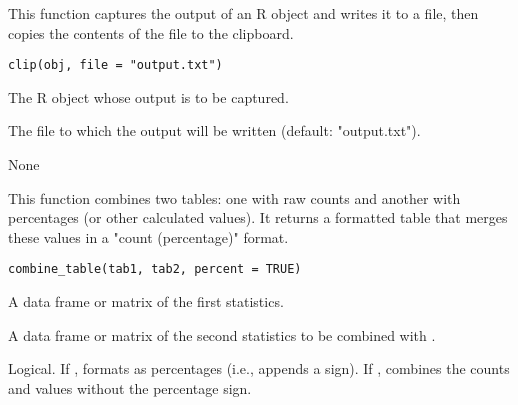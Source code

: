 \documentclass[a4paper]{book}
\begin{document}
%
\begin{Description}
This function captures the output of an R object and writes it to a file, then copies the contents of the file to the clipboard.
\end{Description}
%
\begin{Usage}
\begin{verbatim}
clip(obj, file = "output.txt")
\end{verbatim}
\end{Usage}
%
\begin{Arguments}
\begin{ldescription}
\item[\code{obj}] The R object whose output is to be captured.

\item[\code{file}] The file to which the output will be written (default: "output.txt").
\end{ldescription}
\end{Arguments}
%
\begin{Value}
None
\end{Value}
%
\begin{Description}
This function combines two tables: one with raw counts and another with percentages (or other calculated values). It returns a formatted table that merges these values in a "count (percentage)" format.
\end{Description}
%
\begin{Usage}
\begin{verbatim}
combine_table(tab1, tab2, percent = TRUE)
\end{verbatim}
\end{Usage}
%
\begin{Arguments}
\begin{ldescription}
\item[\code{tab1}] A data frame or matrix of the first statistics.

\item[\code{tab2}] A data frame or matrix of the second statistics to be combined with .

\item[\code{percent}] Logical. If , formats  as percentages (i.e., appends a \AsIs{\texttt{\%}} sign). If , combines the counts and values without the percentage sign.
\end{ldescription}
\end{Arguments}
\end{document}

